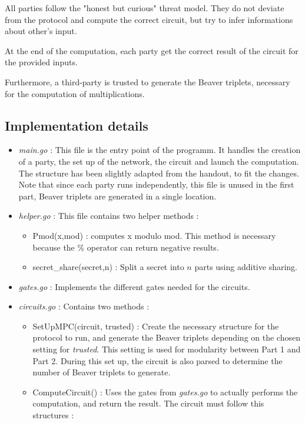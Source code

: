 \documentclass[10pt,conference]{IEEEtran}
\begin{document}
All parties follow the "honest but curious" threat model. They do not deviate from the protocol and compute the correct circuit, but try to infer informations about other's input.

At the end of the computation, each party get the correct result of the circuit for the provided inputs.

Furthermore, a third-party is trusted to generate the Beaver triplets, necessary for the computation of multiplications.

\subsection{Implementation details}
\begin{itemize}
    \item \textit{main.go} : This file is the entry point of the programm. It handles the creation of a party, the set up of the network, the circuit and launch the computation. The structure has been slightly adapted from the handout, to fit the changes. Note that since each party runs independently, this file is unused in the first part, Beaver triplets are generated in a single location.
    \item \textit{helper.go} : This file contains two helper methods :
        \begin{itemize}
            \item Pmod(x,mod) : computes x modulo mod. This method is necessary because the \% operator can return negative results.
            \item secret\_share(secret,n) : Split a secret into $n$ parts using additive sharing.
        \end{itemize}
    \item \textit{gates.go} : Implements the different gates needed for the circuits.
    \item \textit{circuits.go} : Contains two methods :
        \begin{itemize}
            \item SetUpMPC(circuit, trusted) : Create the necessary structure for the protocol to run, and generate the Beaver triplets depending on the chosen setting for \textit{trusted}. This setting is used for modularity between Part 1 and Part 2. During this set up, the circuit is also parsed to determine the number of Beaver triplets to generate.
            \item ComputeCircuit() : Uses the gates from \textit{gates.go} to actually performs the computation, and return the result. The circuit must follow this structures :

\end{itemize}
\end{itemize}
\end{document}
